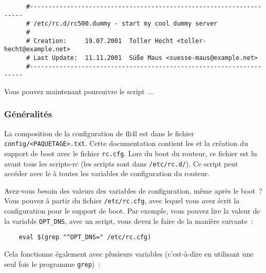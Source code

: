 \begin{example}
\begin{verbatim}
      #--------------------------------------------------------------------
      # /etc/rc.d/rc500.dummy - start my cool dummy server
      #
      # Creation:     19.07.2001  Toller Hecht <toller-hecht@example.net>
      # Last Update:  11.11.2001  Süße Maus <suesse-maus@example.net>
      #--------------------------------------------------------------------
\end{verbatim}
\end{example}

    Vous pouvez maintenant poursuivre le script ...



\subsubsection{Généralités}

    La composition de la configuration de fli4l est dans le fichier
    \texttt{config/<PAQUETAGE>.txt}. 
    Cette documentation contient les 
	et la création du support de boot avec le fichier \texttt{rc.cfg}. Lors du boot
	du routeur, ce fichier est lu avant tous les scripts-rc (les scripts sont dans
	\texttt{/etc/rc.d/}). Ce script peut accéder avec le  à
	toutes les variables de configuration du routeur.

    Avez-vous besoin des valeurs des variables de configuration, même après
	le boot~? Vous pouvez à partir du fichier \texttt{/etc/rc.cfg}, avec lequel
	vous avez écrit la configuration pour le support de boot. Par exemple, vous
	pouvez lire la valeur de la variable \texttt{OPT\_DNS}, avec un script, vous
	devez le faire de la manière suivante~:

\begin{example}
\begin{verbatim}
    eval $(grep "^OPT_DNS=" /etc/rc.cfg)
\end{verbatim}
\end{example}

    Cela fonctionne également avec plusieurs variables (c'est-à-dire en
	utilisant une seul fois le programme \texttt{grep})~:

